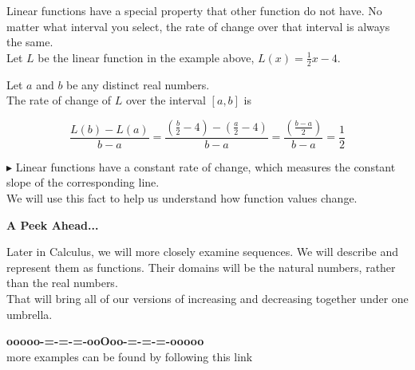 \documentclass{ximera}
\begin{document}
Linear functions have a special property that other function do not have.  No matter what interval you select, the rate of change over that interval is always the same. \\



Let $L$ be the linear function in the example above, $L(x) = \frac{1}{2} x - 4$. 

Let $a$ and $b$ be any distinct real numbers. \\

The rate of change of $L$ over the interval $[a, b]$ is


\[
\frac{L(b) - L(a)}{b - a} = \frac{\left( \frac{b}{2} - 4 \right) - \left( \frac{a}{2} - 4 \right)}{b-a} 
= \frac{\left( \frac{b - a}{2} \right)}{b-a} = \frac{1}{2}
\]



\textbf{\textcolor{blue!55!black}{$\blacktriangleright$}} Linear functions have a constant rate of change, which measures the constant slope of the corresponding line. \\



We will use this fact to help us understand how function values change.



\textbf{\textcolor{red!70!black}{A Peek Ahead...}}



Later in Calculus, we will more closely examine sequences.  We will describe and represent them as functions.  Their domains will be the natural numbers, rather than the real numbers. \\


That will bring all of our versions of increasing and decreasing together under one umbrella.


































\begin{center}
\textbf{\textcolor{green!50!black}{ooooo-=-=-=-ooOoo-=-=-=-ooooo}} \\

more examples can be found by following this link\\ 

\end{center}
\end{document}
